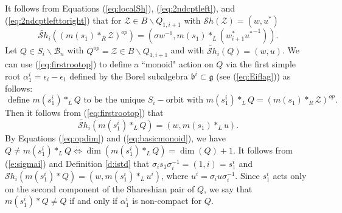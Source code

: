 \documentclass[12pt]{amsart}
\numberwithin{equation}{section}
\newcommand{\cZ}{{\mathcal Z}}
\newcommand{\fg}{\mbox{${\mathfrak g}$}}
\newcommand{\fb}{\mbox{${\mathfrak b}$}}
\newcommand{\eps}{\epsilon}
\newcommand{\B}{\mathcal{B}}
\newcommand{\Sh}{\mathcal{S}h}
\begin{document}
It follows from Equations (\ref{eq:localSh}), (\ref{eq:2ndcptleft}), and (\ref{eq:2ndcptlefttoright}) that for $\cZ\in B\backslash Q_{1,i+1}$ with 
$\Sh(\cZ)=(w, u^{*})$ 
\begin{equation}\label{eq:firstrootop}
\widetilde{\Sh}_{i}((m(s_{1})*_{R}\cZ)^{op})=(\sigma w^{-1}, m(s_{1})*_{L}( w_{i+1}^{*}{u^{*}}^{-1})). 
\end{equation}
Let $Q\in S_{i}\backslash\B_{n}$ with $Q^{op}=\cZ\in B\backslash Q_{1,i+1}$ and with $\widetilde{\Sh}_{i}(Q)=(w,u)$.  We can use (\ref{eq:firstrootop}) to define a ``monoid" action on $Q$ via the first simple root 
$\alpha_{1}^{i}=\eps_{i}-\eps_{1}$ defined by the Borel subalgebra $\fb^{i}\subset\fg$ (see (\ref{eq:Eiflag})) as follows:   
\begin{equation}\label{eq:ms1defn}
\mbox{ define } m(s_{1}^{i})*_{L} Q\mbox{ to be the unique } S_{i}-\mbox{orbit with } m(s_{1}^{i})*_{L} Q=(m(s_{1})*_{R} \cZ)^{op}.
\end{equation}
Then it follows from (\ref{eq:firstrootop}) that 
\begin{equation}\label{eq:ms1shpair}
\widetilde{\Sh}_{i}(m(s_{1}^{i})*_{L} Q)=(w, m(s_{1})*_{L} u).
\end{equation}
By Equations (\ref{eq:opdim}) and (\ref{eq:basicmonoid}), we have $Q\neq m(s_{1}^{i})*_{L} Q\iff \dim(m(s_{1}^{i})*_{L} Q)=\dim(Q)+1$.  It follows from (\ref{e:sigmai}) and Definition \ref{d:istd} that $\sigma_{i}s_{1}\sigma_{i}^{-1}=(1,i)=s_{1}^{i}$ and $\Sh_{i}(m(s_{1}^{i})*Q)=(w, m(s_{1}^{i})*_{L} u^{i})$, where $u^{i}=\sigma_{i} u\sigma_{i}^{-1}.$  Since $s_{1}^{i}$ acts only on the second component of the Shareshian pair of $Q$, we say that $m(s_{1}^{i})*Q\neq Q$ if and only if $\alpha_{1}^{i}$ is non-compact for $Q$. 
\end{document}
